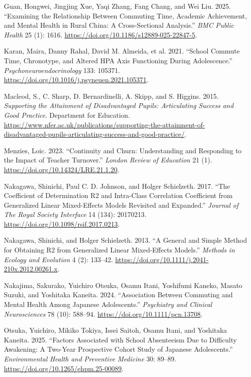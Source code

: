 \documentclass[
  12pt,
  titlepage]{article}
\newlength{\cslhangindent}
\newenvironment{CSLReferences}[2] %
 {\begin{list}{}{%
  \setlength{\itemindent}{0pt}
  \setlength{\leftmargin}{0pt}
  \setlength{\parsep}{0pt}
  \ifodd #1
   \setlength{\leftmargin}{\cslhangindent}
   \setlength{\itemindent}{-1\cslhangindent}
  \fi
  \setlength{\itemsep}{#2\baselineskip}}}
 {\end{list}}
\begin{document}
\begin{CSLReferences}{1}{1}
Guan, Hongwei, Jingjing Xue, Yaqi Zhang, Fang Chang, and Wei Liu. 2025.
{``Examining the Relationship Between Commuting Time, Academic
Achievement, and Mental Health in Rural {China}: A Cross-Sectional
Analysis.''} \emph{BMC Public Health} 25 (1): 1616.
\url{https://doi.org/10.1186/s12889-025-22847-5}.

Karan, Maira, Danny Rahal, David M. Almeida, et al. 2021. {``School
Commute Time, Chronotype, and Altered {HPA} Axis Functioning During
Adolescence.''} \emph{Psychoneuroendocrinology} 133: 105371.
\url{https://doi.org/10.1016/j.psyneuen.2021.105371}.

Macleod, S., C. Sharp, D. Bernardinelli, A. Skipp, and S. Higgins. 2015.
\emph{Supporting the {Attainment} of {Disadvantaged} {Pupils}:
{Articulating} {Success} and {Good} {Practice}}. Department for
Education.
\url{https://www.nfer.ac.uk/publications/supporting-the-attainment-of-disadvantaged-pupils-articulating-success-and-good-practice/}.

Menzies, Loic. 2023. {``Continuity and Churn: Understanding and
Responding to the Impact of Teacher Turnover.''} \emph{London Review of
Education} 21 (1). \url{https://doi.org/10.14324/LRE.21.1.20}.

Nakagawa, Shinichi, Paul C. D. Johnson, and Holger Schielzeth. 2017.
{``The Coefficient of Determination {R2} and Intra-Class Correlation
Coefficient from Generalized Linear Mixed-Effects Models Revisited and
Expanded.''} \emph{Journal of The Royal Society Interface} 14 (134):
20170213. \url{https://doi.org/10.1098/rsif.2017.0213}.

Nakagawa, Shinichi, and Holger Schielzeth. 2013. {``A General and Simple
Method for Obtaining {R2} from Generalized Linear Mixed-Effects
Models.''} \emph{Methods in Ecology and Evolution} 4 (2): 133--42.
\url{https://doi.org/10.1111/j.2041-210x.2012.00261.x}.

Nakajima, Sakurako, Yuichiro Otsuka, Osamu Itani, Yoshifumi Kaneko,
Masato Suzuki, and Yoshitaka Kaneita. 2024. {``Association Between
Commuting and Mental Health Among {Japanese} Adolescents.''}
\emph{Psychiatry and Clinical Neurosciences} 78 (10): 588--94.
\url{https://doi.org/10.1111/pcn.13708}.

Otsuka, Yuichiro, Mikiko Tokiya, Issei Saitoh, Osamu Itani, and
Yoshitaka Kaneita. 2025. {``Factors Associated with School Absenteeism
Due to Difficulty Awakening: A Two-Year Prospective Cohort Study of
{Japanese} Adolescents.''} \emph{Environmental Health and Preventive
Medicine} 30: 89--89. \url{https://doi.org/10.1265/ehpm.25-00089}.


\end{CSLReferences}
\end{document}
